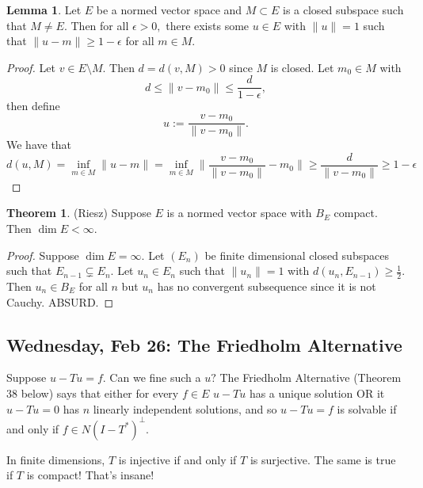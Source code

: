 \documentclass[10pt, oneside]{article}
\theoremstyle{definition}
\newtheorem{thm}{Theorem}
\newtheorem{lem}{Lemma}
\begin{document}
\begin{lem}
    Let $E$ be a normed vector space and $M\subset E$ is a closed subspace such that $M\neq E.$ Then for all $\epsilon>0,$ there exists some $u\in E$ with $\|u\| = 1$ such that $\|u - m\| \geq 1-\epsilon$ for all $m \in M.$
\end{lem}
\begin{proof}
    Let $v \in E\setminus M.$ Then $d = d(v,M) >0$ since $M$ is closed. Let $m_0 \in M$ with 
    \[d \leq \|v -m_0\| \leq \frac{d}{1-\epsilon},\] then define 
    \[u := \frac{v - m_0}{\|v - m_0\|}.\] We have that 
    \[d(u, M) = \inf_{m \in M}\|u-m\| = \inf_{m \in M}\|\frac{v - m_0}{\|v - m_0\|} - m_0\| \geq \frac{d}{\|v - m_0\|}  \geq 1 - \epsilon\]
\end{proof}

\begin{thm}
    (Riesz) Suppose $E$ is a normed vector space with $B_E$ compact. Then $\dim E < \infty.$ 
\end{thm}
\begin{proof}
    Suppose $\dim E = \infty.$ Let $(E_n)$ be finite dimensional closed subspaces such that $E_{n-1}\subsetneq E_n.$ Let $u_n \in E_n$ such that $\|u_n\| = 1$ with $d(u_n, E_{n-1}) \geq \frac{1}{2}.$ Then $u_n \in B_E$ for all $n$ but $u_n$ has no convergent subsequence since it is not Cauchy. ABSURD. 
\end{proof}

\subsection{Wednesday, Feb 26: The Friedholm Alternative}
Suppose $u - Tu = f.$ Can we fine such a $u?$ The Friedholm Alternative (Theorem 38 below) says that either for every $f\in E$ $u - Tu$ has a unique solution OR it $u- Tu = 0$ has $n$ linearly independent solutions, and so $u - Tu = f$ is solvable if and only if $f \in N(I - T^*)^\perp.$ 

In finite dimensions, $T$ is injective if and only if $T$ is surjective. The same is true if $T$ is compact! That's insane! 
\end{document}
